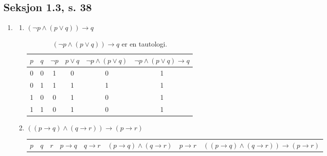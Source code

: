 \documentclass[a4paper, 12pt]{article}  %
\newcommand{\rarr}{\rightarrow}
\begin{document}
\subsection*{Seksjon 1.3, s. 38}
\begin{enumerate}
    \item [\boxed{12}]
          \begin{enumerate}
              \item $(\neg p \land (p \lor q)) \rarr q$
                    \begin{table}[h]
                        \begin{center}
                            \begin{tabular}{|c|c|c|c|c|c|}
                                \hline
                                $p$ & $q$ & $\neg p$ & $p \lor q$ & $\neg p \land (p \lor q)$ & $\neg p \land (p \lor q) \rarr q$ \\
                                \hline
                                0   & 0   & 1        & 0          & 0                         & 1                                 \\
                                0   & 1   & 1        & 1          & 1                         & 1                                 \\
                                1   & 0   & 0        & 1          & 0                         & 1                                 \\
                                1   & 1   & 0        & 1          & 0                         & 1                                 \\
                                \hline
                            \end{tabular}
                            \caption*{$(\neg p \land (p \lor q)) \rarr q$ er en tautologi.}
                        \end{center}
                    \end{table} \newpage
              \item $((p \rarr q) \land (q \rarr r)) \rarr (p \rarr r)$
                    \begin{table}[h]
                        \begin{center}
                            \begin{tabular}{|c|c|c|c|c|c|c|c|}
                                \hline
                                $p$ & $q$ & $r$ & $p \rarr q$ & $q \rarr r$ & $(p \rarr q) \land (q \rarr r)$ & $p \rarr r$ & $((p \rarr q) \land (q \rarr r)) \rarr (p \rarr r)$ \\

\end{tabular}
\end{center}
\end{table}
\end{enumerate}
\end{enumerate}
\end{document}
